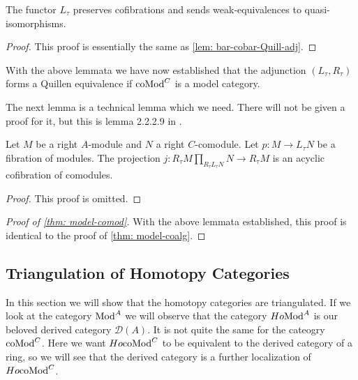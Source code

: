 \documentclass[../thesis.tex]{subfiles}
\begin{document}
            \begin{lemma}
                The functor $L_\tau$ preserves cofibrations and sends weak-equivalences to quasi-isomorphisms.
            \end{lemma}

            \begin{proof}
                This proof is essentially the same as \ref{lem: bar-cobar-Quill-adj}.
            \end{proof}

            With the above lemmata we have now established that the adjunction $(L_\tau, R_\tau)$ forms a Quillen equivalence if $\tt{coMod}^C$ is a model category.

            The next lemma is a technical lemma which we need. There will not be given a proof for it, but this is lemma 2.2.2.9 in \cite{LefevreHasegawa03}.

            \begin{lemma}
                Let $M$ be a right $A$-module and $N$ a right $C$-comodule. Let $p : M \rightarrow L_\tau N$ be a fibration of modules. The projection $j : R_\tau M \prod_{R_\tau L_\tau N} N \rightarrow R_\tau M$ is an acyclic cofibration of comodules.
            \end{lemma}

            \begin{proof}
                This proof is omitted.
            \end{proof}

            \begin{proof}[Proof of \ref{thm: model-comod}]
                With the above lemmata established, this proof is identical to the proof of \ref{thm: model-coalg}.
            \end{proof}

        \subsection{Triangulation of Homotopy Categories}
            In this section we will show that the homotopy categories are triangulated. If we look at the category $\tt{Mod}^A$ we will observe that the category $Ho \tt{Mod}^A$ is our beloved derived category $\mathcal{D}(A)$. It is not quite the same for the cateogry $\tt{coMod}^C$. Here we want $Ho \tt{coMod}^C$ to be equivalent to the derived category of a ring, so we will see that the derived category is a further localization of $Ho \tt{coMod}^C$.
\end{document}
